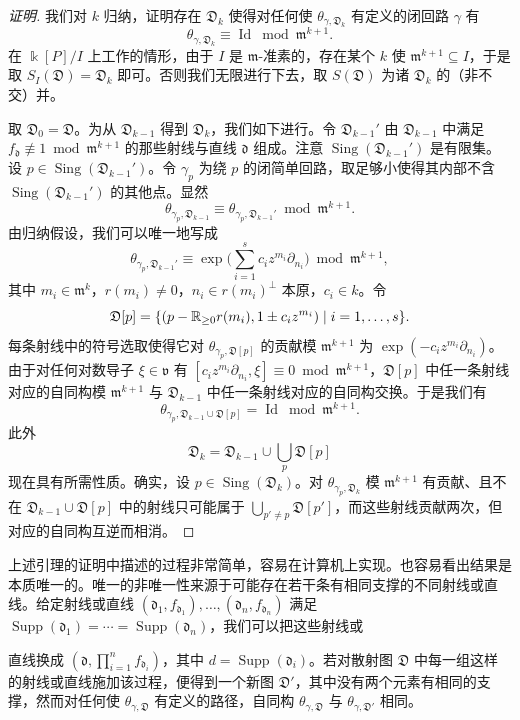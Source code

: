 \begin{proof}[证明]
我们对 $k$ 归纳，证明存在 $\mathfrak{D}_k$ 使得对任何使 $\theta_{\gamma,\mathfrak{D}_k}$ 有定义的闭回路 $\gamma$ 有
\[
\theta_{\gamma,\mathfrak{D}_k}\equiv\operatorname{Id}\bmod\mathfrak{m}^{k+1}.
\]
在 $\Bbbk[P]/I$ 上工作的情形，由于 $I$ 是 $\mathfrak{m}$-准素的，存在某个 $k$ 使 $\mathfrak{m}^{k+1}\subseteq I$，于是取 $S_I(\mathfrak{D})=\mathfrak{D}_k$ 即可。否则我们无限进行下去，取 $S(\mathfrak{D})$ 为诸 $\mathfrak{D}_k$ 的（非不交）并。

取 $\mathfrak{D}_0=\mathfrak{D}$。为从 $\mathfrak{D}_{k-1}$ 得到 $\mathfrak{D}_k$，我们如下进行。令 $\mathfrak{D}_{k-1}'$ 由 $\mathfrak{D}_{k-1}$ 中满足 $f_{\mathfrak{d}}\not\equiv1\bmod\mathfrak{m}^{k+1}$ 的那些射线与直线 $\mathfrak{d}$ 组成。注意 $\operatorname{Sing}(\mathfrak{D}_{k-1}')$ 是有限集。设 $p\in\operatorname{Sing}(\mathfrak{D}_{k-1}')$。令 $\gamma_p$ 为绕 $p$ 的闭简单回路，取足够小使得其内部不含 $\operatorname{Sing}(\mathfrak{D}_{k-1}')$ 的其他点。显然
\[
\theta_{\gamma_p,\mathfrak{D}_{k-1}}\equiv\theta_{\gamma_p,\mathfrak{D}_{k-1}'}\bmod\mathfrak{m}^{k+1}.
\]
由归纳假设，我们可以唯一地写成
\[
\theta_{\gamma_p,\mathfrak{D}_{k-1}'}\equiv\exp\Big(\sum_{i=1}^sc_iz^{m_i}\partial_{n_i}\Big)\bmod\mathfrak{m}^{k+1},
\]
其中 $m_i\in\mathfrak{m}^k$，$r(m_i)\ne0$，$n_i\in r(m_i)^\perp$ 本原，$c_i\in k$。令
\[
\mathfrak{D}[p]=\{(p-\mathbb{R}_{\ge0}r(m_i),1\pm c_iz^{m_i})\mid i=1,\dots,s\}.
\]
每条射线中的符号选取使得它对 $\theta_{\gamma_p,\mathfrak{D}[p]}$ 的贡献模 $\mathfrak{m}^{k+1}$ 为 $\exp(-c_iz^{m_i}\partial_{n_i})$。由于对任何对数导子 $\xi\in\mathfrak{v}$ 有 $[c_iz^{m_i}\partial_{n_i},\xi]\equiv0\bmod\mathfrak{m}^{k+1}$，$\mathfrak{D}[p]$ 中任一条射线对应的自同构模 $\mathfrak{m}^{k+1}$ 与 $\mathfrak{D}_{k-1}$ 中任一条射线对应的自同构交换。于是我们有
\[
\theta_{\gamma_p,\mathfrak{D}_{k-1}\cup\mathfrak{D}[p]}=\operatorname{Id}\bmod\mathfrak{m}^{k+1}.
\]
此外
\[
\mathfrak{D}_k=\mathfrak{D}_{k-1}\cup\bigcup_p\mathfrak{D}[p]
\]
现在具有所需性质。确实，设 $p\in\operatorname{Sing}(\mathfrak{D}_k)$。对 $\theta_{\gamma_p,\mathfrak{D}_k}$ 模 $\mathfrak{m}^{k+1}$ 有贡献、且不在 $\mathfrak{D}_{k-1}\cup\mathfrak{D}[p]$ 中的射线只可能属于 $\bigcup_{p'\ne p}\mathfrak{D}[p']$，而这些射线贡献两次，但对应的自同构互逆而相消。
\end{proof}

\begin{remark}
上述引理的证明中描述的过程非常简单，容易在计算机上实现。也容易看出结果是本质唯一的。唯一的非唯一性来源于可能存在若干条有相同支撑的不同射线或直线。给定射线或直线 $(\mathfrak{d}_1,f_{\mathfrak{d}_1}),\dots,(\mathfrak{d}_n,f_{\mathfrak{d}_n})$ 满足 $\operatorname{Supp}(\mathfrak{d}_1)=\cdots=\operatorname{Supp}(\mathfrak{d}_n)$，我们可以把这些射线或

直线换成 $(\mathfrak{d},\prod_{i=1}^nf_{\mathfrak{d}_i})$，其中 $d=\operatorname{Supp}(\mathfrak{d}_i)$。若对散射图 $\mathfrak{D}$ 中每一组这样的射线或直线施加该过程，便得到一个新图 $\mathfrak{D}'$，其中没有两个元素有相同的支撑，然而对任何使 $\theta_{\gamma,\mathfrak{D}}$ 有定义的路径，自同构 $\theta_{\gamma,\mathfrak{D}}$ 与 $\theta_{\gamma,\mathfrak{D}'}$ 相同。
\end{remark}

